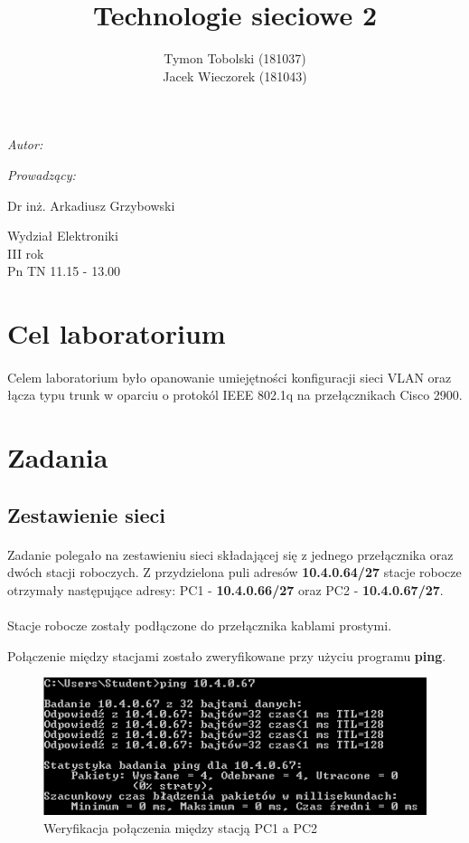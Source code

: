 \documentclass[wide,a4paper,titlepage,12pt] {article}
\title{Technologie sieciowe 2}
\author{Tymon Tobolski (181037)\\ Jacek Wieczorek (181043)}
\makeatletter
\renewcommand{\maketitle}{
\begin{titlepage}
  \begin{center}
    \vspace*{3cm}
    \LARGE \@title \par
    \vspace{2cm}
    \textit{\small Autor:}\par
    \normalsize \@author\par \normalsize
    \vspace{3cm}
    \textit{\small Prowadzący:}\par
    Dr inż. Arkadiusz Grzybowski\par
    \vspace{2cm}
    Wydział Elektroniki\\ III rok\\ Pn TN 11.15 - 13.00\par
    \vspace{4cm}
    \small \@date
  \end{center}
\end{titlepage}
}
\makeatother
\begin{document}
\maketitle
  \section{Cel laboratorium}
  \paragraph{}
  Celem laboratorium było opanowanie umiejętności konfiguracji sieci VLAN oraz łącza typu trunk w oparciu o protokól IEEE 802.1q na przełącznikach Cisco 2900.

  \section{Zadania}

  \subsection{Zestawienie sieci}
  \paragraph{}
  Zadanie polegało na zestawieniu sieci składającej się z jednego przełącznika oraz dwóch stacji roboczych.
  Z przydzielona puli adresów \textbf{10.4.0.64/27} stacje robocze otrzymały następujące adresy: PC1 - \textbf{10.4.0.66/27} oraz PC2 - \textbf{10.4.0.67/27}.
  \paragraph{}
  Stacje robocze zostały podłączone do przełącznika kablami prostymi.

  Połączenie między stacjami zostało zweryfikowane przy użyciu programu \textbf{ping}.

  \begin{figure}[H]
    \begin{center}
      \includegraphics[width=\textwidth]{img/j1.PNG}
      \caption{Weryfikacja połączenia między stacją PC1 a PC2}
    \end{center}
  \end{figure}
\end{document}
